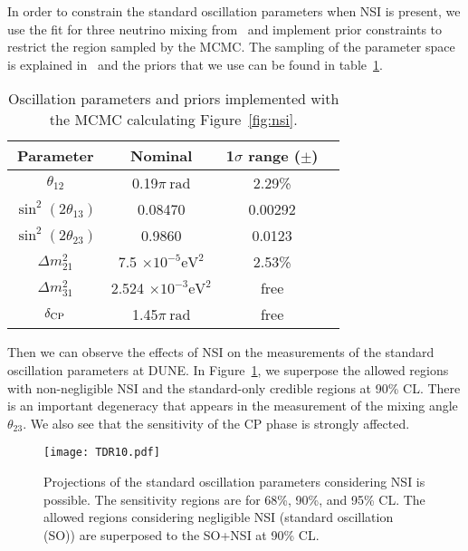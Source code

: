 In order to constrain the standard oscillation parameters when NSI is present, we use the fit for three neutrino mixing from~\cite{Gonzalez-Garcia:2013usa} and implement prior constraints to restrict the region sampled by the MCMC. The sampling of the parameter space is explained in~\cite{Coloma:2015kiu} and the priors that we use can be found in table~\ref{tab:priors1}.
\begin{table}[htb]
\caption{Oscillation parameters and priors implemented with the MCMC calculating Figure~\ref{fig:nsi}.} \label{tab:priors1}
\begin{center}
\begin{tabular}{cccc}
\hline
\hline
Parameter&Nominal&1$\sigma$ range ($\pm$)\\ 
\hline
$\theta_{12}$ &0.19$\pi~\textrm{rad}$&2.29\%\\
$\sin^2(2\theta_{13})$ &0.08470&0.00292\\
$\sin^2(2\theta_{23})$ &0.9860&0.0123\\
$\Delta m^2_{21} $ &7.5 $\times10^{-5}\textrm{eV}^2$&2.53\%\\
$\Delta m^2_{31} $ &2.524 $\times10^{-3}\textrm{eV}^2$&free\\
$\delta_{\rm CP} $ &1.45$\pi~\textrm{rad}$&free\\
\hline 
\hline
\end{tabular}
\end{center}
\end{table}

Then we can observe the effects of NSI on the measurements of the standard oscillation parameters at DUNE. In Figure~\ref{fig:standar-nsi}, we superpose the allowed regions with non-negligible NSI and the standard-only credible regions at 90\% CL. There is an important degeneracy that appears in the measurement of the mixing angle $\theta_{23}$. We also see that the sensitivity of the CP phase is strongly affected.
\begin{figure}[!htb]
	\centering
    \texttt{[image: TDR10.pdf]}
   \caption[Projections of the standard oscillation parameters considering NSI is possible]{\label{fig:standar-nsi}Projections of the standard oscillation parameters considering NSI is possible. The sensitivity regions are for 68\%, 90\%, and 95\% CL. The allowed regions considering negligible NSI (standard oscillation (SO)) are superposed to the SO+NSI at 90\% CL.}
\end{figure}

